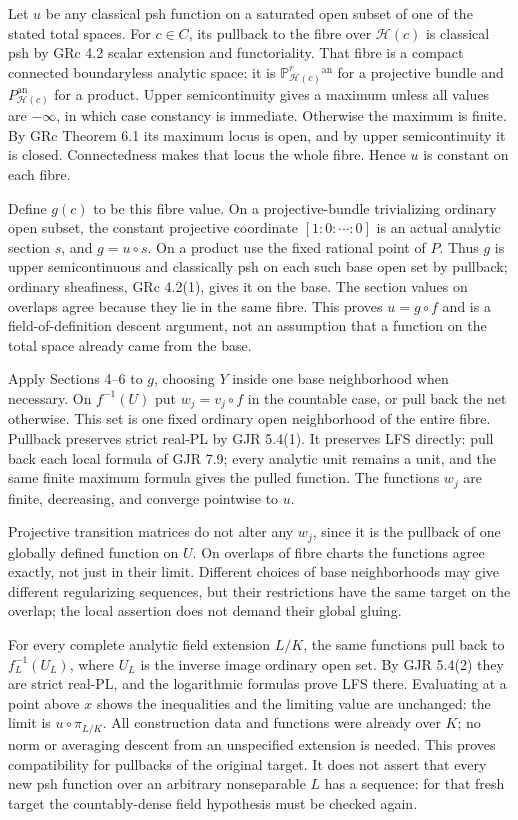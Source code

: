 \documentclass[11pt]{article}
\begin{document}
Let $u$ be any classical psh function on a saturated open subset of one of the stated total spaces. For $c\in C$, its pullback to the fibre over $\mathcal H(c)$ is classical psh by GRc 4.2 scalar extension and functoriality. That fibre is a compact connected boundaryless analytic space: it is $\mathbb P^r_{\mathcal H(c)}{}^{\mathrm{an}}$ for a projective bundle and $P_{\mathcal H(c)}^{\mathrm{an}}$ for a product. Upper semicontinuity gives a maximum unless all values are $-\infty$, in which case constancy is immediate. Otherwise the maximum is finite. By GRc Theorem 6.1 its maximum locus is open, and by upper semicontinuity it is closed. Connectedness makes that locus the whole fibre. Hence $u$ is constant on each fibre.

Define $g(c)$ to be this fibre value. On a projective-bundle trivializing ordinary open subset, the constant projective coordinate $[1:0:\cdots:0]$ is an actual analytic section $s$, and $g=u\circ s$. On a product use the fixed rational point of $P$. Thus $g$ is upper semicontinuous and classically psh on each such base open set by pullback; ordinary sheafiness, GRc 4.2(1), gives it on the base. The section values on overlaps agree because they lie in the same fibre. This proves $u=g\circ f$ and is a field-of-definition descent argument, not an assumption that a function on the total space already came from the base.

Apply Sections 4--6 to $g$, choosing $Y$ inside one base neighborhood when necessary. On $f^{-1}(U)$ put $w_j=v_j\circ f$ in the countable case, or pull back the net otherwise. This set is one fixed ordinary open neighborhood of the entire fibre. Pullback preserves strict real-PL by GJR 5.4(1). It preserves LFS directly: pull back each local formula of GJR 7.9; every analytic unit remains a unit, and the same finite maximum formula gives the pulled function. The functions $w_j$ are finite, decreasing, and converge pointwise to $u$.

Projective transition matrices do not alter any $w_j$, since it is the pullback of one globally defined function on $U$. On overlaps of fibre charts the functions agree exactly, not just in their limit. Different choices of base neighborhoods may give different regularizing sequences, but their restrictions have the same target on the overlap; the local assertion does not demand their global gluing.

For every complete analytic field extension $L/K$, the same functions pull back to $f_L^{-1}(U_L)$, where $U_L$ is the inverse image ordinary open set. By GJR 5.4(2) they are strict real-PL, and the logarithmic formulas prove LFS there. Evaluating at a point above $x$ shows the inequalities and the limiting value are unchanged: the limit is $u\circ\pi_{L/K}$. All construction data and functions were already over $K$; no norm or averaging descent from an unspecified extension is needed. This proves compatibility for pullbacks of the original target. It does not assert that every new psh function over an arbitrary nonseparable $L$ has a sequence: for that fresh target the countably-dense field hypothesis must be checked again.
\end{document}
